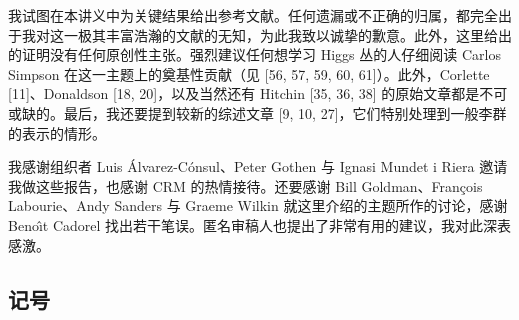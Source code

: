 我试图在本讲义中为关键结果给出参考文献。任何遗漏或不正确的归属，都完全出于我对这一极其丰富浩瀚的文献的无知，为此我致以诚挚的歉意。此外，这里给出的证明没有任何原创性主张。强烈建议任何想学习 Higgs 丛的人仔细阅读 Carlos Simpson 在这一主题上的奠基性贡献（见 [56, 57, 59, 60, 61]）。此外，Corlette [11]、Donaldson [18, 20]，以及当然还有 Hitchin [35, 36, 38] 的原始文章都是不可或缺的。最后，我还要提到较新的综述文章 [9, 10, 27]，它们特别处理到一般李群的表示的情形。

我感谢组织者 Luis \'Alvarez-C\'onsul、Peter Gothen 与 Ignasi Mundet i Riera 邀请我做这些报告，也感谢 CRM 的热情接待。还要感谢 Bill Goldman、Fran\c{c}ois Labourie、Andy Sanders 与 Graeme Wilkin 就这里介绍的主题所作的讨论，感谢 Beno\^{\i}t Cadorel 找出若干笔误。匿名审稿人也提出了非常有用的建议，我对此深表感激。

\subsection*{记号}

